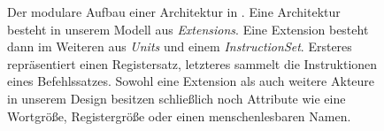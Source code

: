 \begin{figure}[h!]
{
  }
  \caption{Der modulare Aufbau einer Architektur in \erasim{}. Eine Architektur besteht in unserem Modell aus \emph{Extensions}. Eine Extension besteht dann im Weiteren aus \emph{Units} und einem \emph{InstructionSet}. Ersteres repräsentiert einen Registersatz, letzteres sammelt die Instruktionen eines Befehlssatzes. Sowohl eine Extension als auch weitere Akteure in unserem Design besitzen schließlich noch Attribute wie eine Wortgröße, Registergröße oder einen menschenlesbaren Namen.}
  \label{fig:arch-design}
  \vspace{-0.2cm}
\end{figure}
